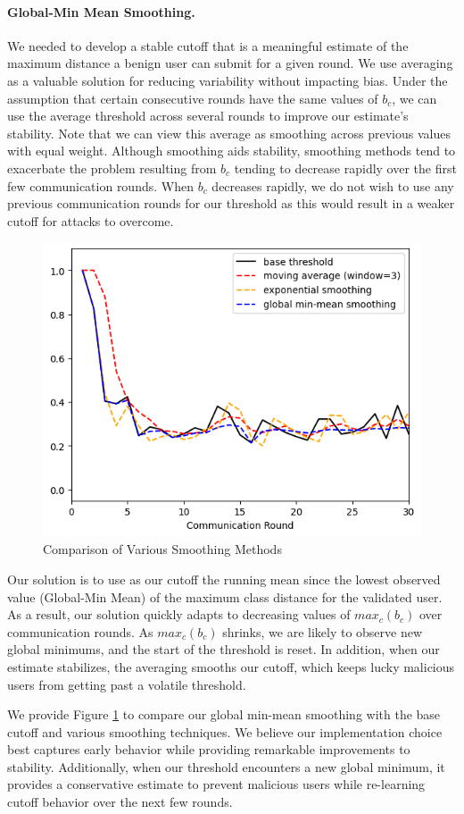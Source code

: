 \documentclass{article} %
\begin{document}
\paragraph{Global-Min Mean Smoothing. } We needed to develop a stable cutoff that is a meaningful estimate of the maximum distance a benign user can submit for a given round. We use averaging as a valuable solution for reducing variability without impacting bias. Under the assumption that certain consecutive rounds have the same values of $b_c$, we can use the average threshold across several rounds to improve our estimate's stability. Note that we can view this average as smoothing across previous values with equal weight. Although smoothing aids stability, smoothing methods tend to exacerbate the problem resulting from $b_c$ tending to decrease rapidly over the first few communication rounds. When $b_c$ decreases rapidly, we do not wish to use any previous communication rounds for our threshold as this would result in a weaker cutoff for attacks to overcome. 

\begin{figure}
    \includegraphics[width=.45\textwidth]{make_article/make_visuals/visuals/smoothing--d_rounds30.png}
    \caption{Comparison of Various Smoothing Methods}
    \label{fig: smoothing}
\end{figure}

Our solution is to use as our cutoff the running mean since the lowest observed value (Global-Min Mean) of the maximum class distance for the validated user. As a result, our solution quickly adapts to decreasing values of $max_c (b_c)$ over communication rounds. As $max_c (b_c)$ shrinks, we are likely to observe new global minimums, and the start of the threshold is reset. In addition, when our estimate stabilizes, the averaging smooths our cutoff, which keeps lucky malicious users from getting past a volatile threshold. 

We provide Figure \ref{fig: smoothing} to compare our global min-mean smoothing with the base cutoff and various smoothing techniques. We believe our implementation choice best captures early behavior while providing remarkable improvements to stability. Additionally, when our threshold encounters a new global minimum, it provides a conservative estimate to prevent malicious users while re-learning cutoff behavior over the next few rounds.
\end{document}
